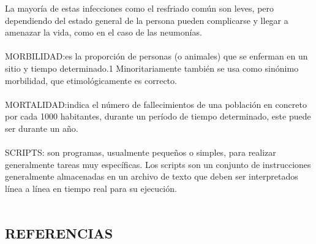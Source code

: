 \documentclass[a4paper,openright,12pt]{book}
\theoremstyle{definition}
\theoremstyle{remark}
\begin{document}
La mayoría de estas infecciones como el resfriado común son leves, pero dependiendo del estado general de la persona pueden complicarse y llegar a amenazar la vida, como en el caso de las neumonías. \\\\
MORBILIDAD:es la proporción de personas (o animales) que se enferman en un sitio y tiempo determinado.1 Minoritariamente también se usa como sinónimo morbilidad, que etimológicamente es correcto.  \\\\
MORTALIDAD:indica el número de fallecimientos de una población en concreto por cada 1000 habitantes, durante un período de tiempo determinado, este puede ser durante un año. \\\\
SCRIPTS: son programas, usualmente pequeños o simples, para realizar generalmente tareas muy específicas. Los scripts son un conjunto de instrucciones generalmente almacenadas en un archivo de texto que deben ser interpretados línea a línea en tiempo real para su ejecución.\\\\
\clearpage

\begin{center}
 \chapter{REFERENCIAS}\label{cap.referencias}
\end{center}
\end{document}

